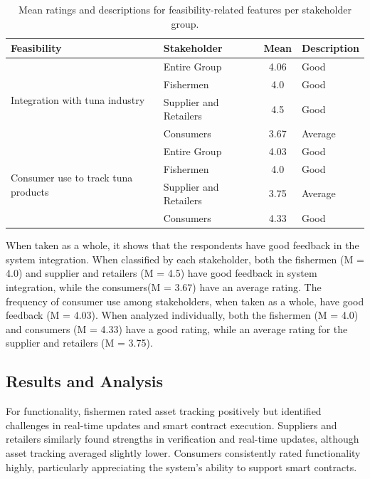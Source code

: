 \vspace{1cm}
\begin{table}[h]
	\centering
	\begin{tabular}{|l|l|c|l|}
		\hline
		\textbf{Feasibility} & \textbf{Stakeholder} & \textbf{Mean} & \textbf{Description} \\ \hline
		\multirow{4}{*}{Integration with tuna industry} 
		& Entire Group & 4.06 & Good \\ \cline{2-4}
		& Fishermen & 4.0 & Good \\ \cline{2-4}
		& Supplier and Retailers & 4.5 & Good \\ \cline{2-4}
		& Consumers & 3.67 & Average \\ \hline
		
		\multirow{4}{*}{Consumer use to track tuna products} 
		& Entire Group & 4.03 & Good \\ \cline{2-4}
		& Fishermen & 4.0 & Good \\ \cline{2-4}
		& Supplier and Retailers & 3.75 & Average \\ \cline{2-4}
		& Consumers & 4.33 & Good \\ \hline
		
	\end{tabular}
	\caption{Mean ratings and descriptions for feasibility-related features per stakeholder group.}
	\label{tab:feasibility}
\end{table}

When taken as a whole, it shows that the respondents have good feedback in the system integration. When classified by each stakeholder, both the fishermen (M = 4.0) and supplier and retailers (M = 4.5) have good feedback in system integration, while the consumers(M = 3.67) have an average rating. The frequency of consumer use among stakeholders, when taken as a whole, have good feedback (M = 4.03). When analyzed individually, both the fishermen (M = 4.0) and consumers (M = 4.33) have a good rating, while an average rating for the supplier and retailers (M = 3.75).

\subsection{Results and Analysis}	
For functionality, fishermen rated asset tracking positively but identified challenges in real-time updates and smart contract execution. Suppliers and retailers similarly found strengths in verification and real-time updates, although asset tracking averaged slightly lower. Consumers consistently rated functionality highly, particularly appreciating the system's ability to support smart contracts.

